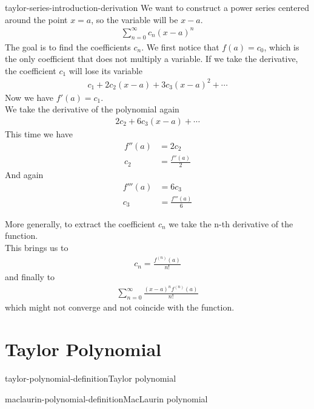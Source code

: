 \documentclass[preview]{standalone}
\begin{document}
\begin{snippet}{taylor-series-introduction-derivation}
    We want to construct a power series centered around the point \(x=a\),
    so the variable will be \(x-a\).
    \begin{align*}
        \sum_{n=0}^{\infty}c_n{(x-a)}^n
    \end{align*}
    The goal is to find the coefficients \(c_n\).
    We first notice that \(f(a)=c_0\), which is the only coefficient that does not multiply a variable.
    If we take the derivative, the coefficient \(c_1\) will lose its variable
    \begin{align*}
        c_1+2c_2(x-a)+3c_3{(x-a)}^2+\cdots
    \end{align*}
    Now we have \(f'(a)=c_1\).
    \\
    We take the derivative of the polynomial again
    \begin{align*}
        2c_2+6c_3(x-a)+\cdots
    \end{align*}
    This time we have
    \begin{align*}
        f''(a)&=2c_2\\
        c_2&=\frac{f''(a)}{2}
    \end{align*}
    And again
    \begin{align*}
        f'''(a)&=6c_3\\
        c_3&=\frac{f'''(a)}{6}
    \end{align*}

    More generally, to extract the coefficient \(c_n\) we take the n-th derivative of the function. \\
    This brings us to
    \begin{align*}
        c_n=\frac{f^{(n)}(a)}{n!}
    \end{align*}
    and finally to
    \begin{align*}
        \sum_{n=0}^{\infty}\frac{{(x-a)}^n f^{(n)}(a)}{n!}
    \end{align*}
    which might not converge and not coincide with the function.
\end{snippet}

\section{Taylor Polynomial}

\begin{snippetdefinition}{taylor-polynomial-definition}{Taylor polynomial}
    
\end{snippetdefinition}

\begin{snippetdefinition}{maclaurin-polynomial-definition}{MacLaurin polynomial}
    
\end{snippetdefinition}
\end{document}
